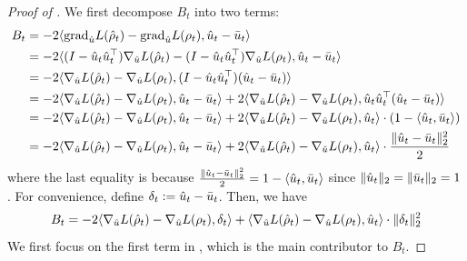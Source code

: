 \begin{proof}[Proof of ]
We first decompose $B_t$ into two terms:
\begin{align}
B_t
& = -2 \langle {\textup{grad}}_{\hat{u}} L({\hat{\rho}}_t) - {\textup{grad}}_{\hat{u}} L(\rho_t), \hat{u}_t - \bar{u}_t \rangle \\
& = -2 \langle (I - \hat{u}_t \hat{u}_t^\top) \nabla_{\hat{u}} L({\hat{\rho}}_t) - (I - \hat{u}_t \hat{u}_t^\top) \nabla_{\hat{u}} L(\rho_t), \hat{u}_t - \bar{u}_t \rangle \\
& = -2 \langle \nabla_{\hat{u}} L({\hat{\rho}}_t) - \nabla_{\hat{u}} L(\rho_t), (I - \hat{u}_t \hat{u}_t^\top) (\hat{u}_t - \bar{u}_t) \rangle \\
& = -2 \langle \nabla_{\hat{u}} L({\hat{\rho}}_t) - \nabla_{\hat{u}} L(\rho_t), \hat{u}_t - \bar{u}_t \rangle + 2 \langle \nabla_{\hat{u}} L({\hat{\rho}}_t) - \nabla_{\hat{u}} L(\rho_t), \hat{u}_t \hat{u}_t^\top (\hat{u}_t - \bar{u}_t) \rangle \\
& = -2 \langle \nabla_{\hat{u}} L({\hat{\rho}}_t) - \nabla_{\hat{u}} L(\rho_t), \hat{u}_t - \bar{u}_t \rangle + 2 \langle \nabla_{\hat{u}} L({\hat{\rho}}_t) - \nabla_{\hat{u}} L(\rho_t), \hat{u}_t \rangle \cdot (1 - \langle \hat{u}_t, \bar{u}_t \rangle) \\
& = -2 \langle \nabla_{\hat{u}} L({\hat{\rho}}_t) - \nabla_{\hat{u}} L(\rho_t), \hat{u}_t - \bar{u}_t \rangle + 2 \langle \nabla_{\hat{u}} L({\hat{\rho}}_t) - \nabla_{\hat{u}} L(\rho_t), \hat{u}_t \rangle \cdot \frac{\|\hat{u}_t - \bar{u}_t\|_2^2}{2}
\end{align}
where the last equality is because $\frac{\|\hat{u}_t - \bar{u}_t\|_2^2}{2} = 1 - \langle \hat{u}_t, \bar{u}_t \rangle$ since $\| \hat{u}_t\|_2 = \|\bar{u}_t\|_2 = 1$. For convenience, define $\delta_t := \hat{u}_t - \bar{u}_t$. Then, we have
\begin{align}
B_t = -2 \langle \nabla_{\hat{u}} L({\hat{\rho}}_t) - \nabla_{\hat{u}} L(\rho_t), \delta_t \rangle + \langle \nabla_{\hat{u}} L({\hat{\rho}}_t) - \nabla_{\hat{u}} L(\rho_t), \hat{u}_t \rangle \cdot \|\delta_t\|_2^2 \label{eq:Bt_decomposition}
\end{align}
We first focus on the first term in , which is the main contributor to $B_t$.


\end{proof}
